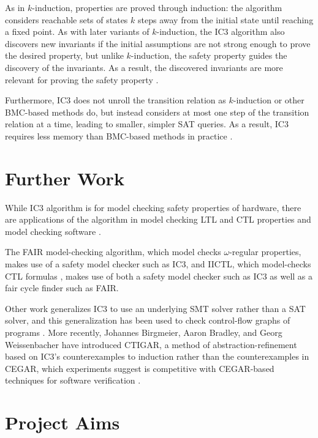 \documentclass[12pt,a4paper,twoside,openright]{report}
\begin{document}
As in $k$-induction, properties are proved through induction:
the algorithm considers reachable sets of states $k$ steps away from the
initial state until reaching a fixed point.
As with later variants of $k$-induction, the IC3 algorithm also discovers
new invariants if the initial assumptions are not strong enough to prove
the desired property, but unlike $k$-induction, the safety property guides
the discovery of the invariants. As a result, the discovered invariants
are more relevant for proving the safety property \cite{bradley12}.

Furthermore, IC3 does not unroll the transition relation as $k$-induction
or other BMC-based methods do, but instead considers at most one step
of the transition relation at a time, leading to smaller,
simpler SAT queries. As a result, IC3 requires less memory than BMC-based
methods in practice \cite{bradley12}.


\section{Further Work}



While IC3 algorithm is for model checking safety properties of hardware,
there are applications of the algorithm in model checking LTL and CTL
properties and model checking software \cite{bradley12}.

The FAIR model-checking algorithm, which model checks $\omega$-regular
properties, makes use of a safety model checker such as IC3, and IICTL,
which model-checks CTL formulas \cite{hassan12}, makes use of both a
safety model checker such as IC3 as well as a fair cycle finder such as
FAIR.

Other work generalizes IC3 to use an underlying SMT solver rather than a
SAT solver, and this generalization has been used to check control-flow
graphs of programs \cite{cimatti12}.
More recently, Johannes Birgmeier, Aaron Bradley, and Georg Weissenbacher
have introduced CTIGAR, a method of abstraction-refinement based on IC3's
counterexamples to induction rather than the counterexamples in CEGAR,
which experiments suggest is competitive with CEGAR-based techniques for
software verification \cite{birgmeier14}.

\section{Project Aims}
\end{document}
